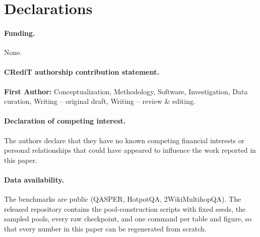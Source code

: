 \documentclass[preprint,12pt]{elsarticle}
\theoremstyle{remark}
\begin{document}
\section*{Declarations}

\paragraph{Funding.} None.

\paragraph{CRediT authorship contribution statement.}
\textbf{First Author:} Conceptualization, Methodology, Software,
Investigation, Data curation, Writing -- original draft, Writing --
review \& editing.

\paragraph{Declaration of competing interest.}
The authors declare that they have no known competing financial
interests or personal relationships that could have appeared to
influence the work reported in this paper.

\paragraph{Data availability.}
The benchmarks are public (QASPER, HotpotQA, 2WikiMultihopQA). The
released repository contains the pool-construction scripts with fixed
seeds, the sampled pools, every raw checkpoint, and one command per
table and figure, so that every number in this paper can be
regenerated from scratch.




\appendix
\end{document}
